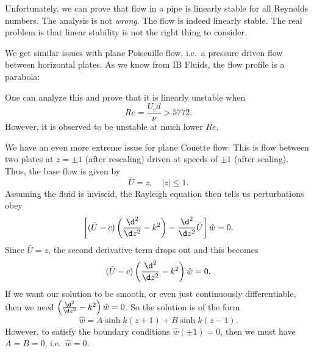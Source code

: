 \documentclass[a4paper]{article}
\begin{document}
Unfortunately, we can prove that flow in a pipe is linearly stable for all Reynolds numbers. The analysis is not \emph{wrong}. The flow is indeed linearly stable. The real problem is that linear stability is not the right thing to consider.


We get similar issues with plane Poiseuille flow, i.e.\ a pressure driven flow between horizontal plates. As we know from IB Fluids, the flow profile is a parabola:
\begin{center}
\end{center}
One can analyze this and prove that it is linearly unstable when
\[
  Re = \frac{U_c d}{\nu} > 5772.
\]
However, it is observed to be unstable at much lower $Re$.

We have an even more extreme issue for plane Couette flow. This is flow between two plates at $z = \pm 1$ (after rescaling) driven at speeds of $\pm 1$ (after scaling). Thus, the base flow is given by
\[
  \bar{U} = z,\quad |z| \leq 1.
\]
Assuming the fluid is inviscid, the Rayleigh equation then tells us perturbations obey
\[
  \left[ (\bar{U} - c) \left(\frac{\d^2}{\d z^2} - k^2\right) - \frac{\d^2}{\d z^2} \bar{U} \right] \hat{w} = 0.
\]
Since $\bar{U} = z$, the second derivative term drops out and this becomes
\[
  (\bar{U} - c) \left(\frac{\d^2}{\d z^2} - k^2\right) \hat{w} = 0.
\]
If we want our solution to be smooth, or even just continuously differentiable, then we need $\left(\frac{\d^2}{\d z^2} - k^2\right) \hat{w} = 0$. So the solution is of the form
\[
  \hat{w} = A \sinh k(z + 1) + B \sinh k(z - 1).
\]
However, to satisfy the boundary conditions $\hat{w}(\pm 1) = 0$, then we must have $A = B = 0$, i.e.\ $\hat{w} = 0$.
\end{document}
